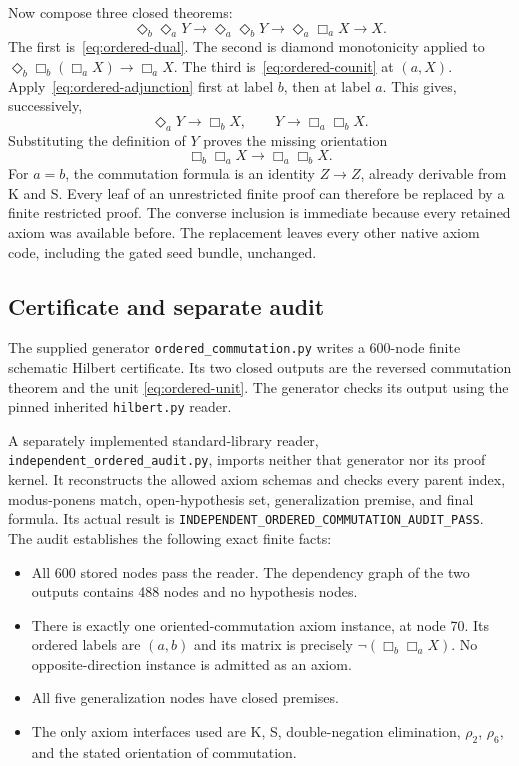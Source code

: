Now compose three closed theorems:
\[
 \Diamond_b\Diamond_a Y
 \longrightarrow \Diamond_a\Diamond_b Y
 \longrightarrow \Diamond_a\Box_a X
 \longrightarrow X.
\]
The first is~\eqref{eq:ordered-dual}.  The second is diamond
monotonicity applied to
$\Diamond_b\Box_b(\Box_a X)\to\Box_a X$.
The third is~\eqref{eq:ordered-counit} at $(a,X)$.
Apply~\eqref{eq:ordered-adjunction} first at label $b$, then at label
$a$.  This gives, successively,
\[
 \Diamond_a Y\to\Box_b X,
 \qquad Y\to\Box_a\Box_b X.
\]
Substituting the definition of $Y$ proves the missing orientation
\[
 \Box_b\Box_a X\to\Box_a\Box_b X.
\]
For $a=b$, the commutation formula is an identity $Z\to Z$, already
derivable from K and S.  Every leaf of an unrestricted finite proof can
therefore be replaced by a finite restricted proof.  The converse
inclusion is immediate because every retained axiom was available
before.  The replacement leaves every other native axiom code,
including the gated seed bundle, unchanged.

\subsection{Certificate and separate audit}

The supplied generator \texttt{ordered\_commutation.py} writes a
600-node finite schematic Hilbert certificate.  Its two closed outputs
are the reversed commutation theorem and the unit
\eqref{eq:ordered-unit}.  The generator checks its output using the
pinned inherited \texttt{hilbert.py} reader.

A separately implemented standard-library reader,
\texttt{independent\_ordered\_audit.py}, imports neither that generator
nor its proof kernel.  It reconstructs the allowed axiom schemas and
checks every parent index, modus-ponens match, open-hypothesis set,
generalization premise, and final formula.  Its actual result is
\texttt{INDEPENDENT\_ORDERED\_COMMUTATION\_AUDIT\_PASS}.
The audit establishes the following exact finite facts:
\begin{itemize}
 \item All 600 stored nodes pass the reader.  The dependency graph of the
 two outputs contains 488 nodes and no hypothesis nodes.
 \item There is exactly one oriented-commutation axiom instance, at
 node 70.  Its ordered labels are $(a,b)$ and its matrix is precisely
 $\neg(\Box_b\Box_a X)$.  No opposite-direction instance is admitted
 as an axiom.
 \item All five generalization nodes have closed premises.
 \item The only axiom interfaces used are K, S, double-negation
 elimination, $\rho_2$, $\rho_6$, and the stated orientation of
 commutation.
\end{itemize}

